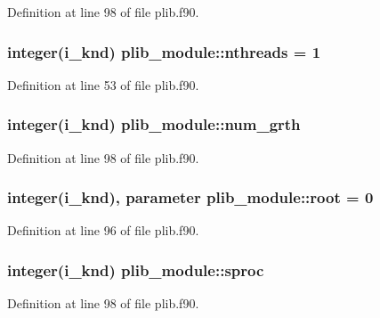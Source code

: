 Definition at line 98 of file plib.\-f90.

\hypertarget{classplib__module_aac4e1911c67e39262528b4ebf471997d}{
\subsubsection[{nthreads}]{\setlength{\rightskip}{0pt plus 5cm}integer(i\-\_\-knd) plib\-\_\-module\-::nthreads = 1}}\label{classplib__module_aac4e1911c67e39262528b4ebf471997d}


Definition at line 53 of file plib.\-f90.

\hypertarget{classplib__module_a8238cefc81a445bee3e137bb94f75e91}{
\subsubsection[{num\-\_\-grth}]{\setlength{\rightskip}{0pt plus 5cm}integer(i\-\_\-knd) plib\-\_\-module\-::num\-\_\-grth}}\label{classplib__module_a8238cefc81a445bee3e137bb94f75e91}


Definition at line 98 of file plib.\-f90.

\hypertarget{classplib__module_a4216863984e9df981d4a2d5a51020ce5}{
\subsubsection[{root}]{\setlength{\rightskip}{0pt plus 5cm}integer(i\-\_\-knd), parameter plib\-\_\-module\-::root = 0}}\label{classplib__module_a4216863984e9df981d4a2d5a51020ce5}


Definition at line 96 of file plib.\-f90.

\hypertarget{classplib__module_aa3b6e5883dfa628f71771e9e6ee3e722}{
\subsubsection[{sproc}]{\setlength{\rightskip}{0pt plus 5cm}integer(i\-\_\-knd) plib\-\_\-module\-::sproc}}\label{classplib__module_aa3b6e5883dfa628f71771e9e6ee3e722}


Definition at line 98 of file plib.\-f90.

